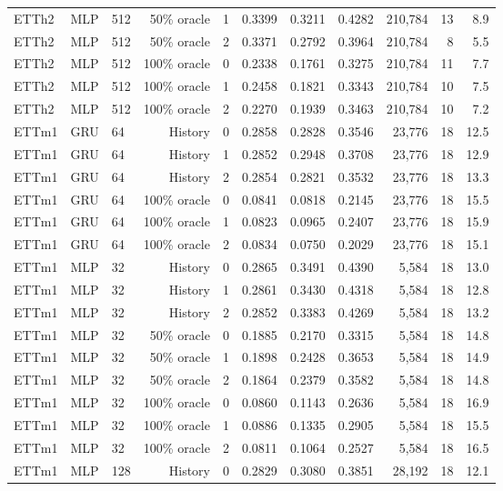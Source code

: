\begin{landscape}
\begin{longtable}{@{}lllrlrrrrrr@{}}
ETTh2 & MLP & 512 & 50\% oracle & 1 & 0.3399 & 0.3211 & 0.4282 & 210,784 & 13 & 8.9 \\
ETTh2 & MLP & 512 & 50\% oracle & 2 & 0.3371 & 0.2792 & 0.3964 & 210,784 & 8 & 5.5 \\
ETTh2 & MLP & 512 & 100\% oracle & 0 & 0.2338 & 0.1761 & 0.3275 & 210,784 & 11 & 7.7 \\
ETTh2 & MLP & 512 & 100\% oracle & 1 & 0.2458 & 0.1821 & 0.3343 & 210,784 & 10 & 7.5 \\
ETTh2 & MLP & 512 & 100\% oracle & 2 & 0.2270 & 0.1939 & 0.3463 & 210,784 & 10 & 7.2 \\
ETTm1 & GRU & 64 & History & 0 & 0.2858 & 0.2828 & 0.3546 & 23,776 & 18 & 12.5 \\
ETTm1 & GRU & 64 & History & 1 & 0.2852 & 0.2948 & 0.3708 & 23,776 & 18 & 12.9 \\
ETTm1 & GRU & 64 & History & 2 & 0.2854 & 0.2821 & 0.3532 & 23,776 & 18 & 13.3 \\
ETTm1 & GRU & 64 & 100\% oracle & 0 & 0.0841 & 0.0818 & 0.2145 & 23,776 & 18 & 15.5 \\
ETTm1 & GRU & 64 & 100\% oracle & 1 & 0.0823 & 0.0965 & 0.2407 & 23,776 & 18 & 15.9 \\
ETTm1 & GRU & 64 & 100\% oracle & 2 & 0.0834 & 0.0750 & 0.2029 & 23,776 & 18 & 15.1 \\
ETTm1 & MLP & 32 & History & 0 & 0.2865 & 0.3491 & 0.4390 & 5,584 & 18 & 13.0 \\
ETTm1 & MLP & 32 & History & 1 & 0.2861 & 0.3430 & 0.4318 & 5,584 & 18 & 12.8 \\
ETTm1 & MLP & 32 & History & 2 & 0.2852 & 0.3383 & 0.4269 & 5,584 & 18 & 13.2 \\
ETTm1 & MLP & 32 & 50\% oracle & 0 & 0.1885 & 0.2170 & 0.3315 & 5,584 & 18 & 14.8 \\
ETTm1 & MLP & 32 & 50\% oracle & 1 & 0.1898 & 0.2428 & 0.3653 & 5,584 & 18 & 14.9 \\
ETTm1 & MLP & 32 & 50\% oracle & 2 & 0.1864 & 0.2379 & 0.3582 & 5,584 & 18 & 14.8 \\
ETTm1 & MLP & 32 & 100\% oracle & 0 & 0.0860 & 0.1143 & 0.2636 & 5,584 & 18 & 16.9 \\
ETTm1 & MLP & 32 & 100\% oracle & 1 & 0.0886 & 0.1335 & 0.2905 & 5,584 & 18 & 15.5 \\
ETTm1 & MLP & 32 & 100\% oracle & 2 & 0.0811 & 0.1064 & 0.2527 & 5,584 & 18 & 16.5 \\
ETTm1 & MLP & 128 & History & 0 & 0.2829 & 0.3080 & 0.3851 & 28,192 & 18 & 12.1 \\

\end{longtable}
\end{landscape}
